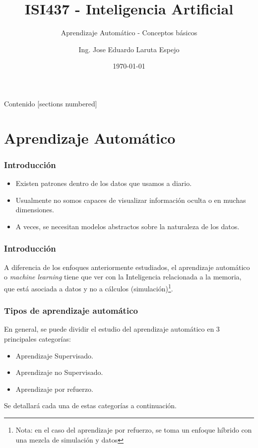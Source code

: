 \documentclass[10pt]{beamer}
\title{ISI437 - Inteligencia Artificial}
\subtitle{Aprendizaje Automático - Conceptos básicos}
\date{\today}
\author{Ing. Jose Eduardo Laruta Espejo}
\institute{Universidad La Salle - Bolivia}
\begin{document}
\maketitle

\begin{frame}[allowframebreaks]{Contenido}
  [sections numbered]
  \tableofcontents[]
\end{frame}


\section{Aprendizaje Automático}
\begin{frame}
  \frametitle{Introducción}

  \begin{itemize}
    \item Existen patrones dentro de los datos que usamos a diario.
    \item Usualmente no somos capaces de visualizar información oculta o en muchas dimensiones.
    \item A veces, se necesitan modelos abstractos sobre la naturaleza de los datos.
  \end{itemize}

\end{frame}

\begin{frame}
  \frametitle{Introducción}

  A diferencia de los enfoques anteriormente estudiados, el aprendizaje automático 
  o \textit{machine learning} tiene que ver con la Inteligencia relacionada a la memoria, 
  que está asociada a datos y no a cálculos (simulación)\footnote{Nota: en el caso del aprendizaje por refuerzo, se toma un enfoque híbrido con una mezcla de simulación y datos}.

\end{frame}

\begin{frame}
  \frametitle{Tipos de aprendizaje automático}
  En general, se puede dividir el estudio del aprendizaje automático en 3 principales categorías:
  \begin{itemize}
    \item Aprendizaje Supervisado.
    \item Aprendizaje no Supervisado.
    \item Aprendizaje por refuerzo.
  \end{itemize}
  
  Se detallará cada una de estas categorías a continuación.

\end{frame}
\end{document}
